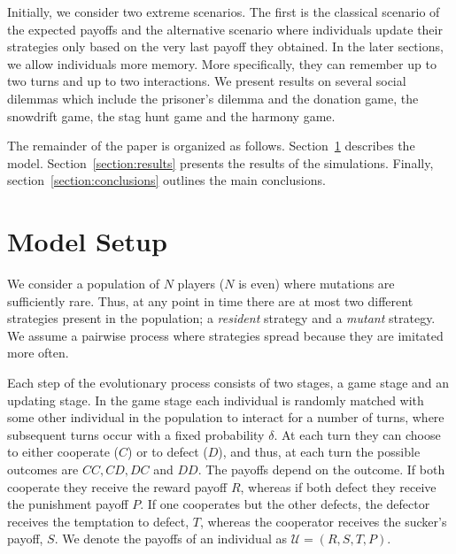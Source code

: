 \documentclass[11pt]{article}
\theoremstyle{plainCl1}
\theoremstyle{plainCl2}
\begin{document}
Initially, we consider two extreme scenarios. The first is the classical
scenario of the expected payoffs and the alternative scenario where individuals
update their strategies only based on the very last payoff they obtained. In the
later sections, we allow individuals more memory. More specifically, they can
remember up to two turns and up to two interactions. We present results on
several social dilemmas which include the prisoner’s dilemma and the donation
game, the snowdrift game, the stag hunt game and the harmony game.

The remainder of the paper is organized as follows. Section~\ref{section:model}
describes the model. Section~\ref{section:results} presents the results of the
simulations. Finally, section~\ref{section:conclusions} outlines the main
conclusions.


\section{Model Setup}\label{section:model}

We consider a population of \(N\) players (\(N\) is even) where mutations are
sufficiently rare. Thus, at any point in time there are at most two
different strategies present in the population; a \textit{resident} strategy
and a \textit{mutant} strategy. We assume a pairwise process where
strategies spread because they are imitated more often.

Each step of the evolutionary process consists of two stages, a game stage and
an updating stage. In the game stage each individual is randomly matched with
some other individual in the population to interact for a number of turns, where
subsequent turns occur with a fixed probability $\delta$. At each turn they
can choose to either cooperate (\(C\)) or to defect (\(D\)), and thus, at
each turn the possible outcomes are \(CC, CD, DC\) and \(DD\). The payoffs
depend on the outcome. If both cooperate they receive the reward payoff
\(R\), whereas if both defect they receive the punishment payoff \(P\).
If one cooperates but the other defects, the defector receives the temptation to
defect, \(T\), whereas the cooperator receives the sucker's payoff, \(S\).
We denote the payoffs of an individual as \(\mathcal{U} = (R, S, T, P)\).
\end{document}
